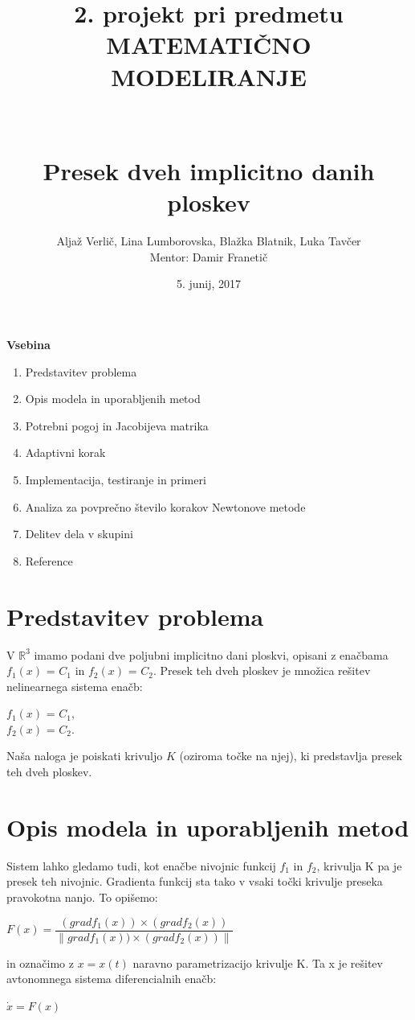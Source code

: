 \documentclass[12pt]{article}
\title{\small{2. projekt pri predmetu MATEMATIČNO MODELIRANJE} \\ \hfill \\ \hfill \\ \huge{\textbf{Presek dveh implicitno danih ploskev}}}
\author{Aljaž Verlič, Lina Lumborovska, Blažka Blatnik, Luka Tavčer \\
	Mentor: Damir Franetič}
\date{5. junij, 2017}
\begin{document}
	
	
	\maketitle
	\newpage
	\textbf{\large{Vsebina}} 
	\begin{enumerate}
		\item Predstavitev problema
		\item Opis modela in uporabljenih metod
		\item Potrebni pogoj in Jacobijeva matrika
		\item Adaptivni korak
		\item Implementacija, testiranje in primeri
		\item Analiza za povprečno število korakov Newtonove metode
		\item Delitev dela v skupini
		\item Reference
	\end{enumerate} 
	\newpage
	
	\section{Predstavitev problema}
	V $\mathbb{R}^3$ imamo podani dve poljubni implicitno dani ploskvi, opisani z enačbama $f_{1}(x)$ = $C_{1}$ in $f_{2}(x)$ = $C_{2}$. Presek teh dveh ploskev je množica rešitev nelinearnega sistema enačb:
	\begin{center}
		$f_{1}(x)$ = $C_{1}$,\\$f_{2}(x)$ = $C_{2}$.
	\end{center}
	Naša naloga je poiskati krivuljo $K$ (oziroma točke na njej), ki predstavlja presek teh dveh ploskev. \\
	
	\section{Opis modela in uporabljenih metod}
	Sistem lahko gledamo tudi, kot enačbe nivojnic funkcij  $f_{1}$ in $f_{2}$, krivulja K pa je presek teh nivojnic. Gradienta funkcij sta tako v vsaki točki krivulje preseka pravokotna nanjo. To opišemo:
	\begin{center}
		$F(x) = \dfrac{(grad f_{1}(x))\times(grad f_{2}(x))}{\|grad f_{1}(x))\times(grad f_{2}(x))\|}$
	\end{center}
	in označimo z $x = x(t)$ naravno parametrizacijo krivulje K. Ta x je rešitev avtonomnega sistema diferencialnih enačb:
	\begin{center}
		$\dot{x} = F(x)$
	\end{center}
	
\end{document}
